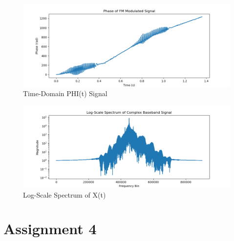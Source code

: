 \documentclass[
	letterpaper, %
	10pt, %
]{CSUniSchoolLabReport}
\begin{document}
\begin{figure}[H] %
	\centering %
	\includegraphics[width=1.2\textwidth]{assignment3a.png} %
	\caption{Time-Domain PHI(t) Signal}
	\label{fig:block}
\end{figure}

\begin{figure}[H] %
	\centering %
	\includegraphics[width=1.2\textwidth]{assignment3b.png} %
	\caption{Log-Scale Spectrum of X(t)}
	\label{fig:block}
\end{figure}

\section{Assignment 4}
\end{document}
